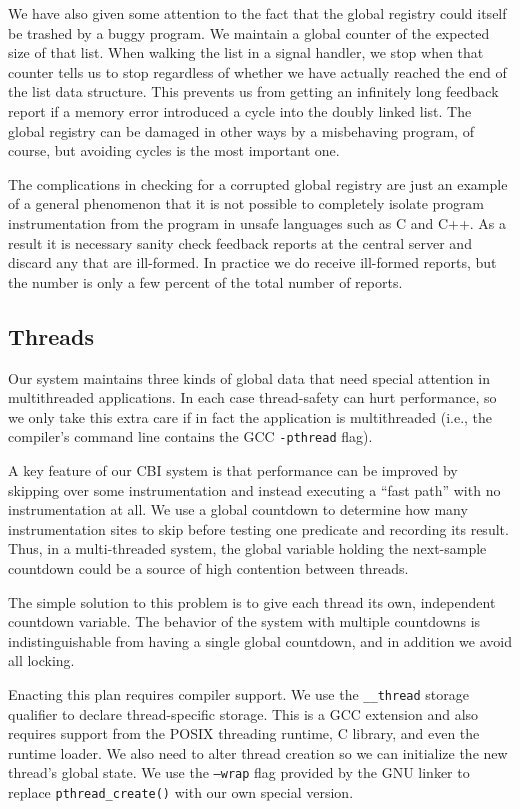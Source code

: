 \documentclass[times,10pt,twocolumn]{article}
\begin{document}
We have also given some attention to the fact that the global registry
could itself be trashed by a buggy program.  We maintain a global
counter of the expected size of that list.  When walking the list in a
signal handler, we stop when that counter tells us to stop regardless
of whether we have actually reached the end of the list data
structure.  This prevents us from getting an infinitely long feedback
report if a memory error introduced a cycle into the doubly linked
list.  The global registry can be damaged in other ways by a
misbehaving program, of course, but avoiding cycles is the most
important one.

The complications in checking for a corrupted global registry are just
an example of a general phenomenon that it is not possible to completely
isolate program instrumentation from the program in unsafe languages such
as C and C++.  As a result it is necessary sanity check feedback reports
at the central server and discard any that are ill-formed.  In practice
we do receive ill-formed reports, but the number is only a few percent
of the total number of reports.


\subsection{Threads}

Our system maintains three kinds of global data that 
need special attention in multithreaded
applications.  In each case thread-safety can hurt performance, 
so we only take this extra care if in fact the application is multithreaded
(i.e., the compiler's command line contains the GCC \texttt{-pthread} flag).

A key feature of our CBI system is that performance can be improved by
skipping over some instrumentation and instead executing a ``fast path''
with no instrumentation at all.  We use a global countdown to determine
how many instrumentation sites to skip before testing one predicate and
recording its result.  Thus, in a multi-threaded system, the global variable
holding the next-sample countdown could be a source of high contention between
threads.

The simple solution to this problem is to give each thread its own,
independent countdown variable.  The behavior of the system with multiple 
countdowns is indistinguishable from having a single global countdown,
and in addition we avoid all locking.

Enacting this plan requires compiler support.  We use the
\texttt{\_\_thread} storage qualifier to declare thread-specific
storage.  This is a GCC extension and also requires support from the
POSIX threading runtime, C library, and even the runtime loader.  
We also need to alter thread creation so we can initialize the
new thread's global state.  We use the \texttt{--wrap} flag provided
by the GNU linker to replace \texttt{pthread\_create()} with our own
special version.  
\end{document}
